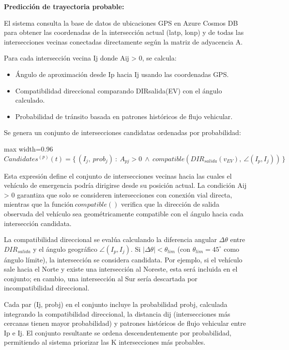 \documentclass[12pt,a4paper,oneside]{report}
\newenvironment{centeredmath}
  {\begin{center}\begin{adjustbox}{max width=0.96\linewidth}\(\displaystyle}
  {\)\end{adjustbox}\end{center}}
\begin{document}
\textbf{Predicción de trayectoria probable:}

El sistema consulta la base de datos de ubicaciones GPS en Azure Cosmos DB para obtener las coordenadas de la intersección actual (latp, lonp) y de todas las intersecciones vecinas conectadas directamente según la matriz de adyacencia A.

Para cada intersección vecina Ij donde Aij \textgreater{} 0, se calcula:

\begin{itemize}
\item
  Ángulo de aproximación desde Ip hacia Ij usando las coordenadas GPS.
\item
  Compatibilidad direccional comparando DIRsalida(EV) con el ángulo calculado.
\item
  Probabilidad de tránsito basada en patrones históricos de flujo vehicular.
\end{itemize}

Se genera un conjunto de intersecciones candidatas ordenadas por probabilidad:

\begin{centeredmath}
Candidates^{(p)}(t) = \{\,(I_{j},\ prob_{j})\ :\ A_{pj} > 0 \ \land\ compatible\!\left(DIR_{salida}(v_{EV}),\ \angle(I_{p},I_{j})\right)\,\}
\end{centeredmath}

Esta expresión define el conjunto de intersecciones vecinas hacia las cuales el vehículo de emergencia podría dirigirse desde su posición actual. La condición Aij \textgreater{} 0 garantiza que solo se consideren intersecciones con conexión vial directa, mientras que la función\(\ compatible()\) verifica que la dirección de salida observada del vehículo sea geométricamente compatible con el ángulo hacia cada intersección candidata.

La compatibilidad direccional se evalúa calculando la diferencia angular \(\Delta\theta\) entre \(DIR_{salida}\) y el ángulo geográfico \(\angle(I_{p}, I_{j})\). Si \(|\Delta\theta| < \theta_{lim}\) (con \(\theta_{lim} = 45^{\circ}\) como ángulo límite), la intersección se considera candidata. Por ejemplo, si el vehículo sale hacia el Norte y existe una intersección al Noreste, esta será incluida en el conjunto; en cambio, una intersección al Sur sería descartada por incompatibilidad direccional.

Cada par (Ij, probj) en el conjunto incluye la probabilidad probj, calculada integrando la compatibilidad direccional, la distancia dij (intersecciones más cercanas tienen mayor probabilidad) y patrones históricos de flujo vehicular entre Ip e Ij. El conjunto resultante se ordena descendentemente por probabilidad, permitiendo al sistema priorizar las K intersecciones más probables.
\end{document}

